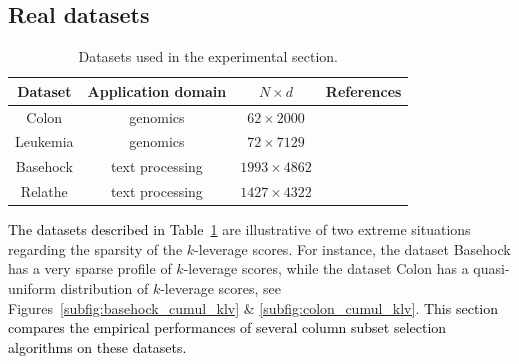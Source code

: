 \documentclass[twoside,11pt]{book}
\newcommand{\rev}[1]{\textcolor{black}{#1}}
\numberwithin{theorem}{chapter}
\numberwithin{definition}{chapter}
\numberwithin{proposition}{chapter}
\numberwithin{corollary}{chapter}
\numberwithin{example}{chapter}
\numberwithin{lemma}{chapter}
\numberwithin{assumption}{chapter}
\numberwithin{equation}{chapter}
\numberwithin{figure}{chapter}
\begin{document}


\subsection{Real datasets}
\label{s:realDatasets}

\begin{table}[h]
\centering
 \begin{tabular}{| c| c | c| c|}
 \hline
  Dataset & Application domain & $N \times d$  &  References\\
 \hline
 Colon & genomics & $62 \times 2000$  & \citep{Al99}\\
 \hline
 Leukemia & genomics &$72 \times 7129$ & \citep{Go99}\\
 \hline
 Basehock & text processing &$1993 \times 4862$ & \citep{Li17} \\
 \hline
 Relathe & text processing & $1427 \times 4322$ & \citep{Li17}\\
 \hline
\end{tabular}
\caption{Datasets used in the experimental section.
\label{table:real_datasets}}
\end{table}

\rev{The datasets described in Table~\ref{table:real_datasets}} are illustrative of two extreme situations regarding the sparsity of the $k$-leverage scores. For instance, the dataset Basehock has a very sparse profile of $k$-leverage scores, while the dataset Colon has a quasi-uniform distribution of $k$-leverage scores, see Figures~\ref{subfig:basehock_cumul_klv}  \& \ref{subfig:colon_cumul_klv}. \rev{This section compares the empirical performances of several column subset selection algorithms on these datasets.}
\end{document}
